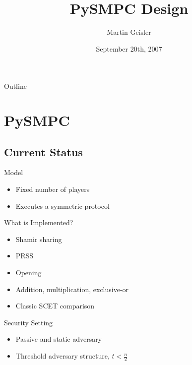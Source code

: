 \documentclass[t]{beamer}
\title{PySMPC Design}
\author{Martin Geisler}
\institute[BRICS]{
  BRICS\\
  Department of Computer Science\\
  University of Aarhus
}
\date{September 20th, 2007}
\begin{document}
\begin{frame}
  \titlepage
\end{frame}

\begin{frame}{Outline}
  \tableofcontents
\end{frame}



\section{PySMPC}

\subsection{Current Status}

\begin{frame}{Model}

  \begin{itemize}
  \item Fixed number of players
  \item Executes a symmetric protocol
  \end{itemize}

\end{frame}

\begin{frame}{What is Implemented?}

  \begin{itemize}
  \item Shamir sharing
  \item PRSS
  \item Opening
  \item Addition, multiplication, exclusive-or
  \item Classic SCET comparison
  \end{itemize}

\end{frame}

\begin{frame}{Security Setting}

  \begin{itemize}
  \item Passive and static adversary
  \item Threshold adversary structure, $t < \frac n 2$
  \end{itemize}

\end{frame}
\end{document}
